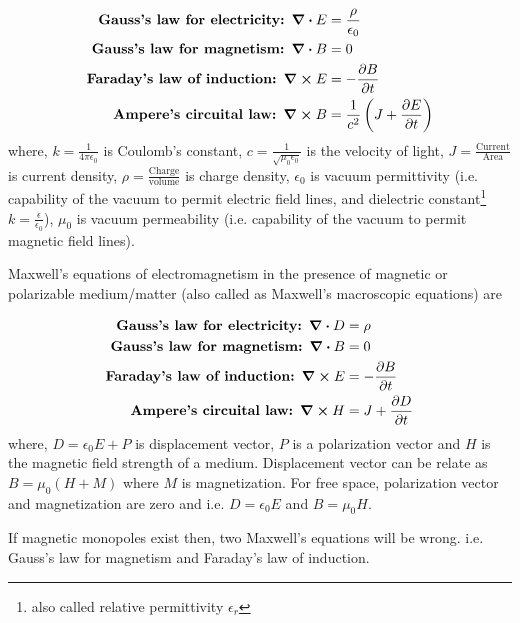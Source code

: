 \begin{align*}
\textbf{Gauss's law for electricity: } \div{E} &= \frac{\rho}{\epsilon_{0}}\\
\textbf{Gauss's law for magnetism: } \div{B} &= 0 \\
\textbf{Faraday's law of induction: } \curl{E} &= -\pdv{B}{t} \\
\textbf{Ampere's circuital law: } \curl{B} &= \frac{1}{c^{2}} \left( J + \pdv{E}{t} \right)
\end{align*}
where, $k = \frac{1}{4\pi \epsilon_{0}}$ is Coulomb's constant,  $c = \frac{1}{\sqrt{\mu_{0}\epsilon_{0}}}$ is the velocity of light, $J = \frac{\text{Current}}{\text{Area}}$ is current density, $\rho = \frac{\text{Charge}}{\text{volume}}$ is charge density, $\epsilon_{0}$ is vacuum permittivity (i.e. capability of the vacuum to permit electric field lines, and dielectric constant\footnote{also called relative permittivity $\epsilon_{r}$} $k = \frac{\epsilon}{\epsilon_{0}}$), $\mu_{0}$ is vacuum permeability (i.e. capability of the vacuum to permit magnetic field lines).

Maxwell's equations of electromagnetism in the presence of magnetic or polarizable medium/matter (also called as Maxwell's macroscopic equations) are

\begin{align*}
\textbf{Gauss's law for electricity: } \div{D} &= \rho \\
\textbf{Gauss's law for magnetism: } \div{B} &= 0 \\
\textbf{Faraday's law of induction: } \curl{E} &= -\pdv{B}{t} \\
\textbf{Ampere's circuital law: } \curl{H} &= J + \pdv{D}{t}
\end{align*}
where, $D = \epsilon_{0} E + P$ is displacement vector, $P$ is a polarization vector and $H$ is the magnetic field strength of a medium. Displacement vector can be relate as $B = \mu_{0} (H + M)$ where $M$ is magnetization. For free space, polarization vector and magnetization are zero and i.e. $D = \epsilon_{0} E$ and $B = \mu_{0} H$.

If magnetic monopoles exist then, two Maxwell's equations will be wrong. i.e. Gauss's law for magnetism and Faraday's law of induction.
